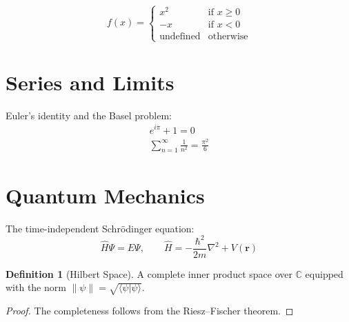 \documentclass[12pt]{article}
\theoremstyle{plain}
\theoremstyle{definition}
\newtheorem{definition}[theorem]{Definition}
\begin{document}
\begin{equation}
  f(x) = \begin{cases}
    x^2        & \text{if } x \geq 0 \\
    -x         & \text{if } x < 0 \\
    \text{undefined} & \text{otherwise}
  \end{cases}
\end{equation}

\section{Series and Limits}

Euler's identity and the Basel problem:
\begin{gather}
  e^{i\pi} + 1 = 0 \label{eq:euler} \\[6pt]
  \sum_{n=1}^{\infty} \frac{1}{n^2} = \frac{\pi^2}{6} \label{eq:basel}
\end{gather}

\section{Quantum Mechanics}

The time-independent Schr\"odinger equation:
\begin{equation}
  \hat{H}\Psi = E\Psi, \qquad \hat{H} = -\frac{\hbar^2}{2m}\nabla^2 + V(\mathbf{r})
\end{equation}

\begin{definition}[Hilbert Space]
  A complete inner product space over $\mathbb{C}$ equipped with the norm
  $\|\psi\| = \sqrt{\langle \psi | \psi \rangle}$.
\end{definition}

\begin{proof}
  The completeness follows from the Riesz--Fischer theorem. \qedhere
\end{proof}
\end{document}
